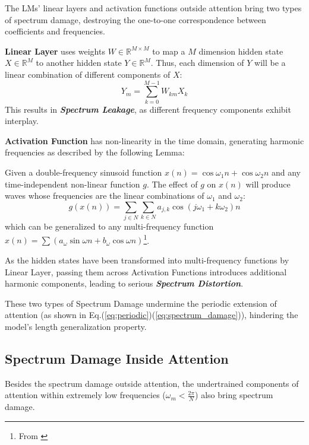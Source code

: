The LMs' linear layers and activation functions outside attention bring two types of spectrum damage, destroying the one-to-one correspondence between coefficients and frequencies.

\textbf{Linear Layer} uses weights $W\in\mathbb{R}^{M \times M}$ to map a $M$ dimension hidden state $X\in\mathbb{R}^M$ to another hidden state $Y\in\mathbb{R}^M$. Thus, each dimension of $Y$ will be a linear combination of different components of $X$:
\begin{equation}
    Y_m = \sum\limits_{k=0}^{M-1}W_{km}X_k
\end{equation}
This results in \textbf{\textit{Spectrum Leakage}}, as different frequency components exhibit interplay. 

\textbf{Activation Function} has non-linearity in the time domain, generating harmonic frequencies as described by the following Lemma:

\begin{lemma}
Given a double-frequency sinusoid function $x(n)=\cos\omega_1 n + \cos\omega_2 n$ and any time-independent non-linear function $g$. The effect of $g$ on $x(n)$ will produce waves whose frequencies are the linear combinations of $\omega_1$ and $\omega_2$:
\begin{equation}
    g(x(n)) = \sum\limits_{j \in N}\sum\limits_{k \in N} a_{j,k} \cos(j \omega_1 + k \omega_2)n
\end{equation}
which can be generalized to any multi-frequency function $x(n)=\sum(a_\omega\sin\omega n+b_\omega\cos\omega n)$\footnote{From \citep{oppenheim1982signal}}.
\label{lemma:harmonic}
\end{lemma}

As the hidden states have been transformed into multi-frequency functions by Linear Layer, passing them across Activation Functions introduces additional harmonic components, leading to serious \textbf{\textit{Spectrum Distortion}}.

These two types of Spectrum Damage undermine the periodic extension of attention (as shown in Eq.(\ref{eq:periodic})(\ref{eq:spectrum_damage})), hindering the model's length generalization property.

\subsection{Spectrum Damage Inside Attention}
\label{subsec:undertrained_frequency}
Besides the spectrum damage outside attention, the undertrained components of attention within extremely low frequencies ($\omega_m<\frac{2\pi}{N}$) also bring spectrum damage.

